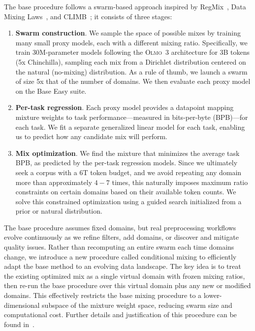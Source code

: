 \documentclass[table]{ai2style/ai2}
\newcommand{\newOlmo}{Olmo\xspace}
\newcommand{\olmothree}{\textsc{\newOlmo~3}\xspace}
\begin{document}
The base procedure follows a swarm-based approach inspired by RegMix~\citep{liu2024regmix}, Data Mixing Laws~\citep{ye2025datamixinglawsoptimizing}, and CLIMB~\citep{diao2025climbclusteringbasediterativedata};
it consists of three stages:
\begin{enumerate}
\item {\bf Swarm construction}. We sample the space of possible mixes by training many small proxy models, each with a different mixing ratio. Specifically, we train 30M-parameter models following the \olmothree architecture for 3B tokens (5x Chinchilla), sampling each mix from a Dirichlet distribution centered on the natural (no-mixing) distribution. As a rule of thumb, we launch a swarm of size 5x that of the number of domains. We then evaluate each proxy model on the Base Easy suite.
\item {\bf Per-task regression}. Each proxy model provides a datapoint mapping mixture weights to task performance---measured in bits-per-byte (BPB)---for each task. We fit a separate generalized linear model for each task, enabling us to predict how any candidate mix will perform.

\item {\bf Mix optimization}. We find the mixture that minimizes the average task BPB, as predicted by the per-task regression models. Since we ultimately seek a corpus with a 6T token budget, and we avoid repeating any domain more than approximately $4-7$ times, this naturally imposes maximum ratio constraints on certain domains based on their available token counts. We solve this constrained optimization using a guided search initialized from a prior or natural distribution.
\end{enumerate}

The base procedure assumes fixed domains, but real preprocessing workflows evolve continuously as we refine filters, add domains, or discover and mitigate quality issues. Rather than recomputing an entire swarm each time domains change, we introduce a new procedure called conditional mixing to efficiently adapt the base method to an evolving data landscape. The key idea is to treat the existing optimized mix as a single virtual domain with frozen mixing ratios, then re-run the base procedure over this virtual domain plus any new or modified domains. This effectively restricts the base mixing procedure to a lower-dimensional subspace of the mixture weight space, reducing swarm size and computational cost. Further details and justification of this procedure can be found in~\cite{olmix}.
\end{document}
